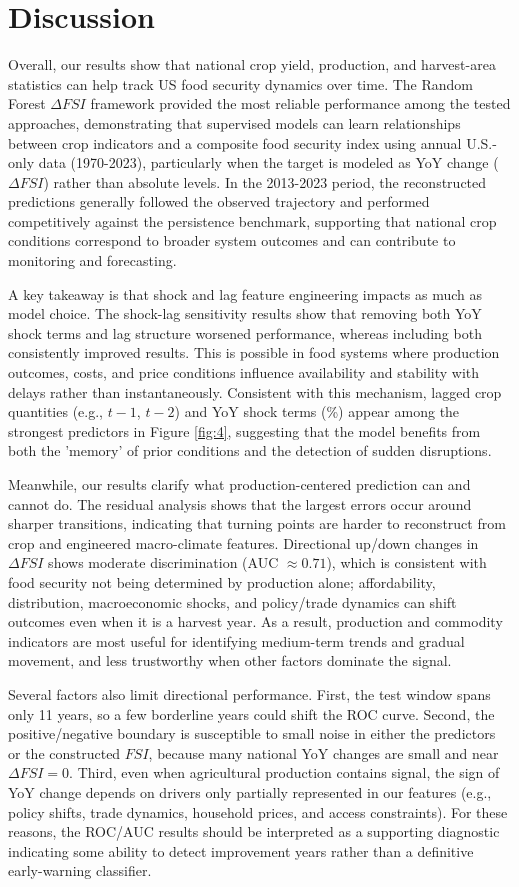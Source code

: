 \documentclass[10pt,twocolumn,letterpaper]{article}
\begin{document}
\section{Discussion}
Overall, our results show that national crop yield, production, and harvest-area statistics can help track US food security dynamics over time. The Random Forest $\Delta FSI$ framework provided the most reliable performance among the tested approaches, demonstrating that supervised models can learn relationships between crop indicators and a composite food security index using annual U.S.-only data (1970-2023), particularly when the target is modeled as YoY change ($\Delta FSI$) rather than absolute levels. In the 2013-2023 period, the reconstructed predictions generally followed the observed trajectory and performed competitively against the persistence benchmark, supporting that national crop conditions correspond to broader system outcomes and can contribute to monitoring and forecasting.

A key takeaway is that shock and lag feature engineering impacts as much as model choice. The shock-lag sensitivity results show that removing both YoY shock terms and lag structure worsened performance, whereas including both consistently improved results. This is possible in food systems where production outcomes, costs, and price conditions influence availability and stability with delays rather than instantaneously. Consistent with this mechanism, lagged crop quantities (e.g., $t\!-\!1$, $t\!-\!2$) and YoY shock terms (\%) appear among the strongest predictors in Figure \ref{fig:4}, suggesting that the model benefits from both the 'memory' of prior conditions and the detection of sudden disruptions.

Meanwhile, our results clarify what production-centered prediction can and cannot do. The residual analysis shows that the largest errors occur around sharper transitions, indicating that turning points are harder to reconstruct from crop and engineered macro-climate features. Directional up/down changes in $\Delta FSI$ shows moderate discrimination (AUC $\approx 0.71$), which is consistent with food security not being determined by production alone; affordability, distribution, macroeconomic shocks, and policy/trade dynamics can shift outcomes even when it is a harvest year. As a result, production and commodity indicators are most useful for identifying medium-term trends and gradual movement, and less trustworthy when other factors dominate the signal.

Several factors also limit directional performance. First, the test window spans only 11 years, so a few borderline years could shift the ROC curve. Second, the positive/negative boundary is susceptible to small noise in either the predictors or the constructed $FSI$, because many national YoY changes are small and near $\Delta FSI=0$. Third, even when agricultural production contains signal, the sign of YoY change depends on drivers only partially represented in our features (e.g., policy shifts, trade dynamics, household prices, and access constraints). For these reasons, the ROC/AUC results should be interpreted as a supporting diagnostic indicating some ability to detect improvement years rather than a definitive early-warning classifier.
\end{document}
